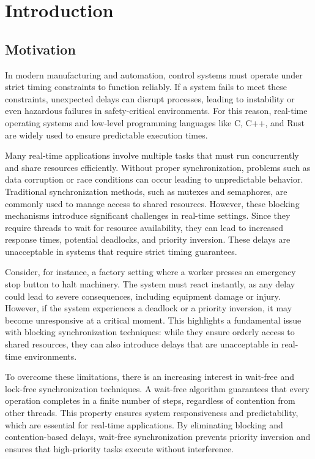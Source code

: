 \chapter{Introduction}\label{ch:introduction}

\section{Motivation}\label{sec:motivation}

In modern manufacturing and automation, control systems must operate under strict timing constraints to function reliably. If a system fails to meet these constraints, unexpected delays can disrupt processes, leading to instability or even hazardous failures in safety-critical environments. For this reason, real-time operating systems and low-level programming languages like C, C++, and Rust are widely used to ensure predictable execution times.

Many real-time applications involve multiple tasks that must run concurrently and share resources efficiently. Without proper synchronization, problems such as data corruption or race conditions can occur leading to unpredictable behavior. Traditional synchronization methods, such as mutexes and semaphores, are commonly used to manage access to shared resources. However, these blocking mechanisms introduce significant challenges in real-time settings. Since they require threads to wait for resource availability, they can lead to increased response times, potential deadlocks, and priority inversion. These delays are unacceptable in systems that require strict timing guarantees. \cite{herlihy1991wait, brandenburg2019multiprocessorrealtimelockingprotocols, kode2024analysisSynchronization}

Consider, for instance, a factory setting where a worker presses an emergency stop button to halt machinery. The system must react instantly, as any delay could lead to severe consequences, including equipment damage or injury. However, if the system experiences a deadlock or a priority inversion, it may become unresponsive at a critical moment. This highlights a fundamental issue with blocking synchronization techniques: while they ensure orderly access to shared resources, they can also introduce delays that are unacceptable in real-time environments.

To overcome these limitations, there is an increasing interest in wait-free and lock-free synchronization techniques. A wait-free algorithm guarantees that every operation completes in a finite number of steps, regardless of contention from other threads. This property ensures system responsiveness and predictability, which are essential for real-time applications. By eliminating blocking and contention-based delays, wait-free synchronization prevents priority inversion and ensures that high-priority tasks execute without interference. \cite{kogan2012methodology, herlihy1991wait}

